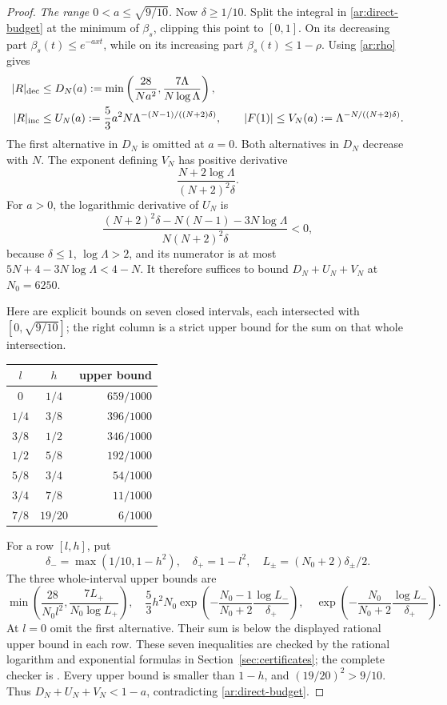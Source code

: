 \begin{proof}
\smallskip
\noindent\emph{The range $0<a\le\sqrt{9/10}$.}
Now $\delta\ge1/10$. Split the integral in
\eqref{ar:direct-budget} at the minimum of $\beta_s$, clipping this
point to $[0,1]$. On its decreasing part
$\beta_s(t)\le e^{-axt}$, while on its increasing part
$\beta_s(t)\le1-\rho$. Using \eqref{ar:rho} gives
\begin{align}
 |R|_{\rm dec}&\le D_N(a):=
 \min\left(\frac{28}{Na^2},\frac{7\Lambda}{N\log\Lambda}\right),
 \label{ar:D}\\
 |R|_{\rm inc}&\le U_N(a):=
 \frac53a^2N\Lambda^{-(N-1)/((N+2)\delta)},\qquad
 |F(1)|\le V_N(a):=\Lambda^{-N/((N+2)\delta)}.
 \label{ar:UV}
\end{align}
The first alternative in $D_N$ is omitted at $a=0$.
Both alternatives in $D_N$ decrease with $N$.  The exponent defining
$V_N$ has positive derivative
\[
 \frac{N+2\log\Lambda}{(N+2)^2\delta}.
\]
For $a>0$, the logarithmic derivative of $U_N$ is
\[
 \frac{(N+2)^2\delta-N(N-1)-3N\log\Lambda}
 {N(N+2)^2\delta}<0,
\]
because $\delta\le1$, $\log\Lambda>2$, and its numerator is at most
$5N+4-3N\log\Lambda<4-N$.
It therefore suffices to bound $D_N+U_N+V_N$ at $N_0=6250$.

Here are explicit bounds on seven closed intervals, each intersected
with $[0,\sqrt{9/10}]$; the right column is a strict upper bound
for the sum on that whole intersection.
\begin{center}
\begin{tabular}{ccr}
\toprule
$l$&$h$&upper bound\\\midrule
$0$&$1/4$&$659/1000$\\
$1/4$&$3/8$&$396/1000$\\
$3/8$&$1/2$&$346/1000$\\
$1/2$&$5/8$&$192/1000$\\
$5/8$&$3/4$&$54/1000$\\
$3/4$&$7/8$&$11/1000$\\
$7/8$&$19/20$&$6/1000$\\\bottomrule
\end{tabular}
\end{center}
For a row $[l,h]$, put
\[
 \delta_- =\max(1/10,1-h^2),\quad \delta_+=1-l^2,
 \quad L_\pm=(N_0+2)\delta_\pm/2.
\]
The three whole-interval upper bounds are
\[
 \min\left(\frac{28}{N_0l^2},\frac{7L_+}{N_0\log L_+}\right),\quad
 \frac53h^2N_0\exp\left(-\frac{N_0-1}{N_0+2}
                          \frac{\log L_-}{\delta_+}\right),\quad
 \exp\left(-\frac{N_0}{N_0+2}\frac{\log L_-}{\delta_+}\right).
\]
At $l=0$ omit the first alternative.  Their sum is below the displayed
rational upper bound in each row. These seven inequalities are checked
by the rational logarithm and exponential formulas in
Section~\ref{sec:certificates}; the complete checker is
.  Every upper bound is smaller than
$1-h$, and $(19/20)^2>9/10$. Thus
$D_N+U_N+V_N<1-a$, contradicting \eqref{ar:direct-budget}.


\end{proof}
